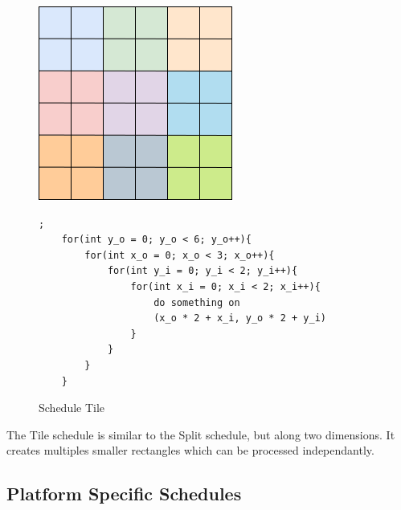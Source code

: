 \begin{figure}[H]

		\begin{minipage}[c]{\EIW}
			\centering
		\includegraphics[width=\textwidth]{Images/Tile.png}
		\end{minipage}
		\begin{minipage}[c]{\ECW}
			\centering
			\begin{lstlisting}[label={code:reorder}];
	for(int y_o = 0; y_o < 6; y_o++){
		for(int x_o = 0; x_o < 3; x_o++){
			for(int y_i = 0; y_i < 2; y_i++){
				for(int x_i = 0; x_i < 2; x_i++){
					do something on
					(x_o * 2 + x_i, y_o * 2 + y_i)
				}
			}
		}
	}
\end{lstlisting}
		\end{minipage}
		\caption{Schedule Tile}
\end{figure}
	The Tile schedule is similar to the Split schedule, but along two dimensions. It creates multiples smaller rectangles which can be processed independantly.

	\subsection{Platform Specific Schedules}
